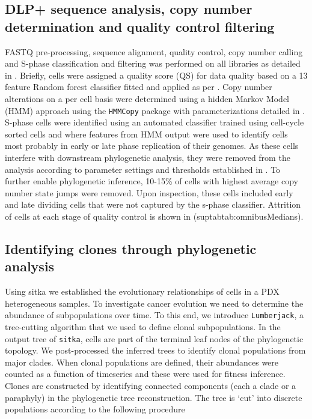 \subsection{DLP+ sequence analysis, copy number determination and quality control filtering}
FASTQ pre-processing, sequence alignment, quality control, copy number calling and S-phase classification and filtering was performed on all libraries as detailed in \cite{laks2019clonal}. Briefly, cells were assigned a quality score (QS) for data quality based on a 13 feature Random forest classifier fitted and applied as per \cite{laks2019clonal}. Copy number alterations on a per cell basis were determined using a hidden Markov Model (HMM) approach using the \texttt{HMMCopy} package with parameterizations detailed in \cite{laks2019clonal}. S-phase cells were identified using an automated classifier trained using cell-cycle sorted cells and where features from HMM output were used to identify cells most probably in early or late phase replication of their genomes. As these cells interfere with downstream phylogenetic analysis, they were removed from the analysis according to parameter settings and thresholds established in \cite{laks2019clonal}. To further enable phylogenetic inference, 10-15\% of cells with highest average copy number state jumps were removed. Upon inspection, these cells included early and late dividing cells that were not captured by the s-phase classifier. 
Attrition of cells at each stage of quality control is shown in (suptabtab:omnibusMedians).



\subsection{Identifying clones through phylogenetic analysis}
Using sitka we established the evolutionary relationships of cells in a PDX heterogeneous samples. To investigate cancer evolution we need to determine the abundance of subpopulations over time. To this end, we introduce \texttt{Lumberjack}, a tree-cutting algorithm that we used to define clonal subpopulations. In the output tree of \texttt{sitka}, cells are part of the terminal leaf nodes of the phylogenetic topology. We post-processed the inferred trees to identify clonal populations from major clades. When clonal populations are defined, their abundances were counted as a function of timeseries and these were used for fitness inference. 
Clones are constructed by identifying connected components (each a clade or a paraphyly) in the phylogenetic tree reconstruction. The tree is `cut' into discrete populations according to the following procedure


